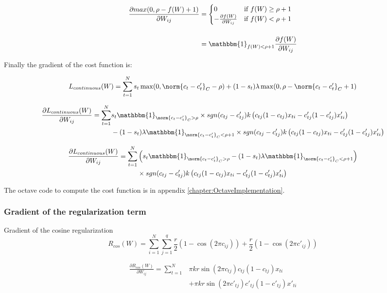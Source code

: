 \[
	\begin{split}
		\frac{\partial max(0, \rho - f(W) + 1)}{\partial W_{ij}} & =
		\begin{cases}
		0                                      & \text{if } f(W) \geq \rho + 1 \\
		-\frac{\partial f(W)}{\partial W_{ij}} & \text{if } f(W) < \rho + 1
		\end{cases} \\[3ex]
		& = \mathbbm{1}_{f(W) < \rho + 1} \frac{\partial f(W)}{\partial W_{ij}}
	\end{split}
\]

Finally the gradient of the cost function is:

\[
	L_{continuous}(W) = \sum\limits_{t=1}^N s_t\max(0, \norm{c_t - c'_t}_{C} - \rho) + (1-s_t)\lambda\max(0, \rho - \norm{c_t - c'_t}_{C} + 1)
\]

\[
\begin{split}
	\frac{\partial L_{continuous}(W)}{\partial W_{ij}} = \sum\limits_{t=1}^N & s_t \mathbbm{1}_{\norm{c_t - c'_t}_{C} > \rho} \times sgn(c_{tj} - c'_{tj}) k \left(c_{tj} (1 - c_{tj}) x_{ti} - c'_{tj} (1 - c'_{tj}) x'_{ti} \right) \\
& - (1 - s_t) \lambda \mathbbm{1}_{\norm{c_t - c'_t}_{C} < \rho + 1} \times sgn(c_{tj} - c'_{tj}) k \left(c_{tj} (1 - c_{tj}) x_{ti} - c'_{tj} (1 - c'_{tj}) x'_{ti} \right)
\end{split}
\]

\[
\begin{split}
	\frac{\partial L_{continuous}(W)}{\partial W_{ij}} = \sum\limits_{t=1}^N & \left(s_t \mathbbm{1}_{\norm{c_t - c'_t}_{C} > \rho} - (1 - s_t) \lambda \mathbbm{1}_{\norm{c_t - c'_t}_{C} < \rho + 1}\right) \\
& \times sgn(c_{tj} - c'_{tj}) k \left(c_{tj} (1 - c_{tj}) x_{ti} - c'_{tj} (1 - c'_{tj}) x'_{ti} \right)
\end{split}
\]

The octave code to compute the cost function is in appendix \ref{chapter:OctaveImplementation}. 

\subsubsection{Gradient of the regularization term}
Gradient of the cosine regularization
\[
	R_{cos}(W) = \sum\limits_{i=1}^N \sum\limits_{j=1}^q \frac{r}{2}(1 - \cos(2 \pi c_{ij})) + \frac{r}{2}(1 - \cos(2 \pi c'_{ij}))
\]

\[
\begin{split}
	\frac{\partial R_{cos}(W)}{\partial W_{ij}} = \sum\limits_{t=1}^N &   \pi kr \sin(2 \pi c_{tj}) c_{tj} (1 - c_{tj}) x_{ti} \\
	                                                                  & + \pi kr \sin(2 \pi c'_{tj}) c'_{tj} (1 - c'_{tj}) x'_{ti}
\end{split}
\]

